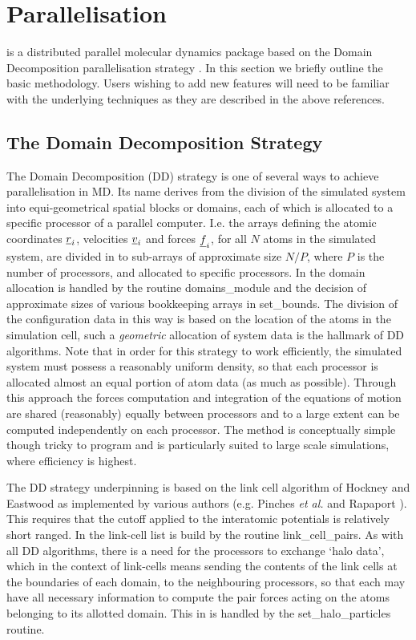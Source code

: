 \section{Parallelisation}

\D is a distributed parallel molecular dynamics package based on
the Domain Decomposition parallelisation strategy
\cite{todorov-04a,pinches-91a,rapaport-91b,smith-91a,smith-93a}.
In this section we briefly outline the basic methodology.  Users
wishing to add new features \D will need to be familiar with the
underlying techniques as they are described in the above
references.

\subsection{The Domain Decomposition Strategy}\label{parallelisation}

The Domain Decomposition (DD) strategy
\cite{todorov-04a,smith-91a} is one of several ways to achieve
parallelisation in MD.  Its name derives
from the division of the simulated system into equi-geometrical
spatial blocks or domains, each of which is allocated to a
specific processor of a parallel computer.  I.e. the arrays
defining the atomic coordinates $\mbox{$\underline{r}$}_{i}$, velocities
$\mbox{$\underline{v}$}_{i}$ and forces $\mbox{$\underline{f}$}_{i}$, for all $N$ atoms in the
simulated system, are divided in to sub-arrays of approximate size
$N/P$, where $P$ is the number of processors, and allocated to
specific processors.  In \D the domain allocation is handled by
the routine {\sc domains\_module} and the decision of approximate
sizes of various bookkeeping arrays in {\sc set\_bounds}.  The
division of the configuration data in this way is based on the
location of the atoms in the simulation cell, such a {\em
geometric} allocation of system data is the hallmark of DD
algorithms.  Note that in order for this strategy to work
efficiently, the simulated system must possess a reasonably
uniform density, so that each processor is allocated almost an equal
portion of atom data (as much as possible).  Through this approach
the forces computation and integration of the equations of motion
are shared (reasonably) equally between processors and to a large
extent can be computed independently on each processor.  The
method is conceptually simple though tricky to program and is
particularly suited to large scale simulations, where efficiency
is highest.

The DD strategy underpinning \D is based on the link cell
algorithm of Hockney and Eastwood \cite{hockney-81a} as
implemented by various authors (e.g. Pinches {\em et al.}
\cite{pinches-91a} and Rapaport \cite{rapaport-91b}).  This
requires that the cutoff applied to the interatomic potentials is
relatively short ranged.  In \D the link-cell list is build by the
routine {\sc link\_cell\_pairs}.  As with all DD algorithms, there
is a need for the processors to exchange `halo data', which in the
context of link-cells means sending the contents of the link cells
at the boundaries of each domain, to the neighbouring processors,
so that each may have all necessary information to compute the
pair forces acting on the atoms belonging to its allotted domain.
This in \D is handled by the {\sc set\_halo\_particles} routine.

